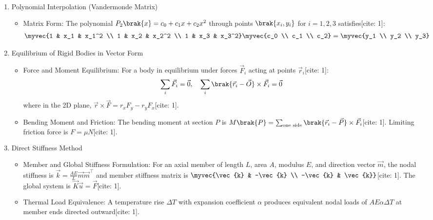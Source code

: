 \begin{enumerate}[label=\thesubsection.\arabic*, ref=\thesubsection.\theenumi,itemsep=0pt]
\item Polynomial Interpolation (Vandermonde Matrix)
\begin{itemize}
\item Matrix Form:
The polynomial $P_2\brak{x} = c_0 + c_1 x + c_2 x^2$ through points $\brak{x_i, y_i}$ for $i=1,2,3$ satisfies[cite: 1]:
\begin{align}
\myvec{1 & x_1 & x_1^2 \\ 1 & x_2 & x_2^2 \\ 1 & x_3 & x_3^2} \myvec{c_0 \\ c_1 \\ c_2} = \myvec{y_1 \\ y_2 \\ y_3}
\end{align}
\end{itemize}

\item Equilibrium of Rigid Bodies in Vector Form
\begin{itemize}
\item Force and Moment Equilibrium:
For a body in equilibrium under forces $\vec{F}_i$ acting at points $\vec{r}_i$[cite: 1]:
\begin{align}
\sum_i \vec{F}_i = \vec{0}, \quad \sum_i \brak{\vec{r}_i - \vec{O}} \times \vec{F}_i = \vec{0}
\end{align}
where in the 2D plane, $\vec{r} \times \vec{F} = r_x F_y - r_y F_x$[cite: 1].
\item Bending Moment and Friction:
The bending moment at section $P$ is $M\brak{P} = \sum_{\text{one side}} \brak{\vec{r}_i - \vec{P}} \times \vec{F}_i$[cite: 1]. Limiting friction force is $F = \mu N$[cite: 1].
\end{itemize}

\item Direct Stiffness Method
\begin{itemize}
\item Member and Global Stiffness Formulation:
For an axial member of length $L$, area $A$, modulus $E$, and direction vector $\vec{m}$, the nodal stiffness is $\vec{k} = \frac{AE}{L}\vec{m}\vec{m}^\top$ and member stiffness matrix is $\myvec{\vec{k} & -\vec{k} \\ -\vec{k} & \vec{k}}$[cite: 1]. The global system is $\vec{K}\vec{u} = \vec{F}$[cite: 1].
\item Thermal Load Equivalence:
A temperature rise $\Delta T$ with expansion coefficient $\alpha$ produces equivalent nodal loads of $AE\alpha\Delta T$ at member ends directed outward[cite: 1].
\end{itemize}


\end{enumerate}
